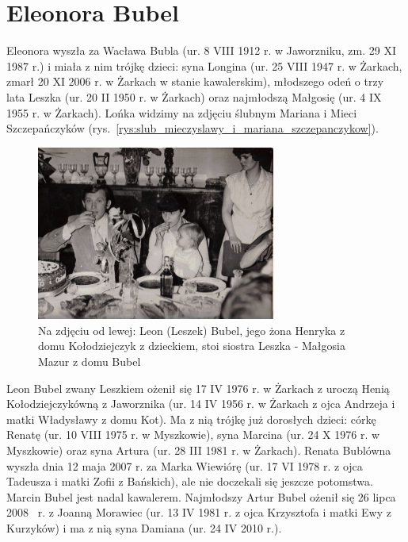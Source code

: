 \section{Eleonora Bubel}

Eleonora wyszła za Wacława Bubla (ur. 8 VIII 1912 r. w Jaworzniku, zm. 29 XI 1987 r.) i miała z nim trójkę dzieci: syna Longina (ur. 25 VIII 1947 r. w Żarkach, zmarł 20 XI 2006 r. w Żarkach w stanie kawalerskim), młodszego odeń o trzy lata Leszka (ur. 20 II 1950 r. w Żarkach) oraz najmłodszą Małgosię (ur. 4 IX 1955 r. w Żarkach). Lońka widzimy na zdjęciu ślubnym Mariana i Mieci Szczepańczyków (rys.~\ref{rys:slub_mieczyslawy_i_mariana_szczepanczykow}).

\begin{figure}[!h]
\begin{center}
\includegraphics[width=0.7\textwidth]{zdjecia/leon_henryka_malgosia_bubel.jpg}
\caption[Leon, Henryka i Małgorzata Bublowie]{Na zdjęciu od lewej: Leon (Leszek) Bubel, jego żona Henryka z domu Kołodziejczyk z dzieckiem, stoi siostra Leszka - Małgosia Mazur z domu Bubel}
\label{rys:leon_henryka_malgosia_bubel}
\end{center}
\end{figure}

Leon Bubel zwany Leszkiem ożenił się 17 IV 1976 r. w Żarkach z uroczą Henią Kołodziejczykówną z Jaworznika (ur. 14 IV 1956 r. w Żarkach z ojca Andrzeja i matki Władysławy z domu Kot). Ma z nią trójkę już dorosłych dzieci: córkę Renatę (ur. 10 VIII 1975 r. w Myszkowie), syna Marcina (ur. 24 X 1976 r. w Myszkowie) oraz syna Artura (ur. 28 III 1981 r. w Żarkach). Renata Bublówna wyszła dnia 12 maja 2007 r.
za Marka Wiewiórę (ur. 17 VI 1978 r. z ojca Tadeusza i matki Zofii z Bańskich), ale nie doczekali się jeszcze potomstwa. Marcin Bubel jest nadal kawalerem. Najmłodszy Artur Bubel ożenił się 26 lipca 2008~ r. z Joanną Morawiec (ur. 13 IV 1981 r. z ojca Krzysztofa i matki Ewy z Kurzyków) i ma z nią syna Damiana (ur. 24 IV 2010 r.).

